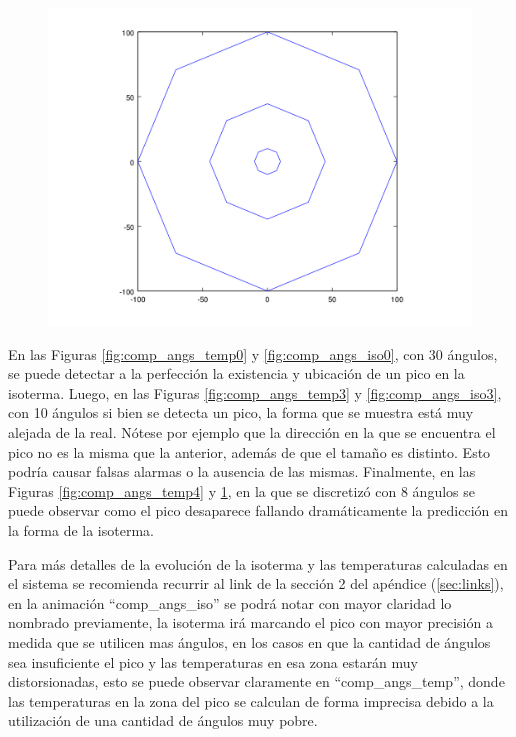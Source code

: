 \begin{figure}[H]
\begin{minipage}{0.30\textwidth}
  \centering
    \includegraphics[width=1\textwidth]{imgs/comp_angulos/comp_angs_iso4.png} 
  \caption{}
  \label{fig:comp_angs_iso4}
\end{minipage}
\end{figure}

En las Figuras \ref{fig:comp_angs_temp0} y \ref{fig:comp_angs_iso0}, con 30 ángulos, se puede detectar a la perfección la existencia y ubicación de un pico en la isoterma. Luego, en las Figuras \ref{fig:comp_angs_temp3} y \ref{fig:comp_angs_iso3}, con 10 ángulos si bien se detecta un pico, la forma que se muestra está muy alejada de la real. Nótese por ejemplo que la dirección en la que se encuentra el pico no es la misma que la anterior, además de que el tamaño es distinto. Esto podría causar falsas alarmas o la ausencia de las mismas.
Finalmente, en las Figuras \ref{fig:comp_angs_temp4} y \ref{fig:comp_angs_iso4}, en la que se discretizó con 8 ángulos se puede observar como el pico desaparece fallando dramáticamente la predicción en la forma de la isoterma. 

Para más detalles de la evolución de la isoterma y las temperaturas calculadas en el sistema se recomienda recurrir al link de la sección 2 del apéndice (\ref{sec:links}), en la animación ``comp\_angs\_iso'' se podrá notar con mayor claridad lo nombrado previamente, la isoterma irá marcando el pico con mayor precisión a medida que se utilicen mas ángulos, en los casos en que la cantidad de ángulos sea insuficiente el pico y las temperaturas en esa zona estarán muy distorsionadas, esto se puede observar claramente en ``comp\_angs\_temp'', donde las temperaturas en la zona del pico se calculan de forma imprecisa debido a la utilización de una cantidad de ángulos muy pobre.


